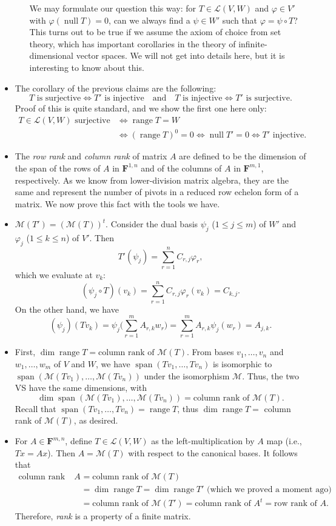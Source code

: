 \documentclass[11pt]{article}
\newcommand{\df}[1]{\textit{\textsf{#1}}}
\newcommand{\F}{\mathbf{F}}
\newcommand{\s}{\operatorname{span}}
\newcommand{\n}{\operatorname{null}}
\renewcommand{\r}{\operatorname{range}}
\renewcommand{\d}{\dim}
\newcommand{\LVW}{\mathcal{L}(V,W)}
\newcommand{\M}{\mathcal{M}}
\newcommand{\bv}{v_1,\dots,v_n}
\renewcommand{\phi}{\varphi}
\begin{document}
\begin{itemize}
\begin{itemize}
        We may formulate our question this way: for $T \in \LVW$ and $\phi \in V'$ with $\phi(\n T) = 0$, can we always find a $\psi \in W'$ such that $\phi = \psi \circ T$? This turns out to be true if we assume the axiom of choice from set theory, which has important corollaries in the theory of infinite-dimensional vector spaces. We will not get into details here, but it is interesting to know about this.
    \end{itemize}
    \item The corollary of the previous claims are the following:
    $$T \text{ is surjective} \iff T' \text{ is injective} \quad \text{and} \quad T \text{ is injective} \iff T' \text{ is surjective}.$$ Proof of this is quite standard, and we show the first one here only: 
    \begin{align*}
        T \in \LVW \text{ surjective} & \iff \r T = W \\ & \iff (\r T)^0 = {0} \iff \n T' = {0} \iff T' \text{ injective}.
    \end{align*}
    \item The \df{row rank} and \df{column rank} of matrix $A$ are defined to be the dimension of the span of the rows of $A$ in $\F^{1,n}$ and of the columns of $A$ in $\F^{m,1}$, respectively. As we know from lower-division matrix algebra, they are the same and represent the number of pivots in a reduced row echelon form of a matrix. We now prove this fact with the tools we have.
    
    \item $\M(T') = (\M(T))^t$. Consider the dual basis $\psi_j$ ($1 \leq j \leq m$) of $W'$ and $\phi_j$ ($1 \leq k \leq n$) of $V'$. Then \[T'(\psi_j) = \sum_{r=1}^n C_{r,j}\phi_r,\] which we evaluate at $v_k$: \[(\psi_j \circ T)(v_k) = \sum_{r=1}^n C_{r,j}\phi_r(v_k) = C_{k,j}.\] On the other hand, we have \[(\psi_j)(Tv_k) = \psi_j\biggl(\sum_{r=1}^mA_{r,k}w_r\biggr) = \sum_{r=1}^m A_{r,k}\psi_j(w_r) = A_{j,k}.\]
    
    \item First, $\d \r T = \text{column rank of } \M(T)$. From bases $\bv$ and $w_1,\dots,w_m$ of $V$ and $W$, we have $\s(Tv_1,\dots,Tv_n)$ is isomorphic to $\s(\M(Tv_1),\dots,\M(Tv_n))$ under the isomorphism $\M$. Thus, the two VS have the same dimensions, with \[\d \s(\M(Tv_1),\dots,\M(Tv_n)) = \text{column rank of } \M(T).\] Recall that $\s(Tv_1,\dots,Tv_n) = \r T$, thus $\d \r T = $ column rank of $\M(T)$, as desired.
    
    \item For $A \in \F^{m,n}$, define $T \in \LVW$ as the left-multiplication by $A$ map (i.e., $Tx = Ax$). Then $A = \M(T)$ with respect to the canonical bases. It follows that
    \begin{align*}
        \text{column rank of } A & = \text{column rank of } \M(T) \\
        & = \d \r T = \d \r T' \text{ (which we proved a moment ago)} \\
        & = \text{column rank of } \M(T') = \text{column rank of } A^t
        = \text{row rank of } A.
    \end{align*}
    Therefore, \df{rank} is a property of a finite matrix.
\end{itemize}
\end{document}
